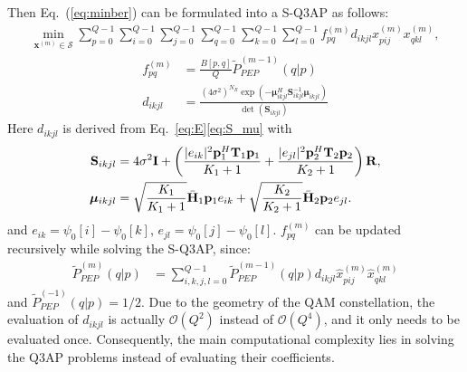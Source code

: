 \documentclass[journal]{IEEEtran}
\begin{document}
Then Eq.~(\ref{eq:minber}) can be formulated into a S-Q3AP as follows:
\begin{align}
  \min_{\mathbf{x}^{(m)}\in \mathcal{S}}
  \sum_{p=0}^{Q-1}\sum_{i=0}^{Q-1}\sum_{j=0}^{Q-1}
  \sum_{q=0}^{Q-1}\sum_{k=0}^{Q-1}\sum_{l=0}^{Q-1}
  f_{pq}^{(m)}d_{ikjl}x_{pij}^{(m)}x_{qkl}^{(m)},
  \label{eq:SQ3AP}
\end{align}
\begin{subequations}
  \begin{align}
    f_{pq}^{(m)} & = \frac{B[p,q]}{Q}\tilde{P}_{PEP}^{(m-1)}(q|p) \\
    d_{ikjl} & =
    \frac{(4\sigma^2)^{N_R}
    \exp(-\bm{\mu}_{ikjl}^H\mathbf{S}_{ikjl}^{-1}\bm{\mu}_{ikjl})} {\det(\mathbf{S}_{ikjl})}
  \end{align}
\end{subequations}
Here $d_{ikjl}$ is derived from Eq.~\eqref{eq:E}\eqref{eq:S_mu} with
\begin{align}
  \mathbf{S}_{ikjl} & = 4\sigma^2\mathbf{I} + \left(\frac{|e_{ik}|^2
  \mathbf{p}_1^H\mathbf{T}_1 \mathbf{p}_1}{K_1+1} + \frac{|e_{jl}|^2
  \mathbf{p}_2^H\mathbf{T}_2 \mathbf{p}_2}{K_2+1}\right) \mathbf{R},\notag\\
  \bm{\mu}_{ikjl} & = \sqrt{\frac{K_1}{K_1+1}}\bar{\mathbf{H}}_1\mathbf{p}_1
  e_{ik} + \sqrt{\frac{K_2}{K_2+1}}\bar{\mathbf{H}}_2\mathbf{p}_2e_{jl}.
\end{align}
and $e_{ik} = \psi_0[i] - \psi_0[k]$, $e_{jl} = \psi_0[j] - \psi_0[l]$.
$f_{pq}^{(m)}$ can be updated recursively while solving the S-Q3AP, since:
\begin{align}
  \tilde{P}_{PEP}^{(m)}(q|p) & =
  \sum_{i,k,j,l=0}^{Q-1}\tilde{P}_{PEP}^{(m-1)}(q|p)d_{ikjl}
  \hat{x}_{pij}^{(m)}\hat{x}_{qkl}^{(m)}
  \label{eq:pep_update}
\end{align}
and $ \tilde{P}_{PEP}^{(-1)}(q|p) = 1/2$. Due to the geometry
of the QAM constellation, the evaluation of $d_{ikjl}$ is actually $\mathcal{O}(Q^2)$ instead of $\mathcal{O}(Q^4)$, and
it only needs to be evaluated once. Consequently, the main computational
complexity lies in solving the Q3AP problems instead of evaluating their
coefficients.
\end{document}
